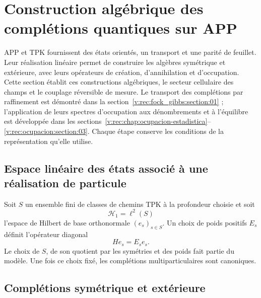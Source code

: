 \section{Construction algébrique des complétions quantiques sur APP}
\label{v:rec:chap:completaciones-cuanticas}
\label{v:sec:completaciones-algebraicas}

APP et TPK fournissent des états orientés, un transport et une parité de feuillet.
Leur réalisation linéaire permet de construire les algèbres symétrique et extérieure,
avec leurs opérateurs de création, d’annihilation et d’occupation. Cette section
établit ces constructions algébriques, le secteur cellulaire des champs et
le couplage réversible de mesure. Le transport des complétions
par raffinement est démontré dans la
section~\ref{v:rec:fock_gibbs:section:01} ; l’application de leurs spectres
d’occupation aux dénombrements et à l’équilibre est développée dans les
sections~\ref{v:rec:chap:ocupacion-estadistica}--\ref{v:rec:ocupacion:section:03}.
Chaque étape conserve les conditions de la représentation qu’elle utilise.

\subsection{Espace linéaire des états associé à une réalisation de particule}
\label{v:rec:completaciones:section:02}

Soit \(S\) un ensemble fini de classes de chemins TPK à la profondeur choisie
et soit
\[
 \mathcal H_1=\ell^2(S)
\]
l’espace de Hilbert de base orthonormale \((e_s)_{s\in S}\). Un choix de
poids positifs \(E_s\) définit l’opérateur diagonal
\[
 He_s=E_se_s.
\]
Le choix de \(S\), de son quotient par les symétries et des poids fait partie
du modèle. Une fois ce choix fixé, les complétions multiparticulaires sont canoniques.

\subsection{Complétions symétrique et extérieure}
\label{v:rec:completaciones:section:03}

